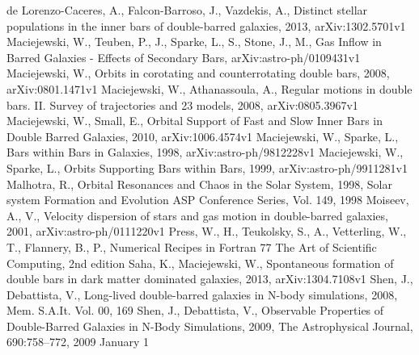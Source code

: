 \documentclass[a4paper,12pt]{article}
\begin{document}
\begin{thebibliography}{1}
de Lorenzo-Caceres, A., Falcon-Barroso, J., Vazdekis, A., Distinct stellar populations in the inner bars of double-barred galaxies, 2013, arXiv:1302.5701v1
Maciejewski, W., Teuben, P., J., Sparke, L., S., Stone, J., M., Gas Inflow in Barred Galaxies - Effects of Secondary Bars, arXiv:astro-ph/0109431v1
Maciejewski, W., Orbits in corotating and counterrotating double bars, 2008, arXiv:0801.1471v1
Maciejewski, W., Athanassoula, A., Regular motions in double bars. II. Survey of trajectories and 23 models, 2008, arXiv:0805.3967v1
Maciejewski, W., Small, E., Orbital Support of Fast and Slow Inner Bars in Double Barred Galaxies, 2010, arXiv:1006.4574v1
Maciejewski, W., Sparke, L., Bars within Bars in Galaxies, 1998, arXiv:astro-ph/9812228v1
Maciejewski, W., Sparke, L., Orbits Supporting Bars within Bars, 1999, arXiv:astro-ph/9911281v1
Malhotra, R., Orbital Resonances and Chaos in the Solar System, 1998, Solar system Formation and Evolution ASP Conference Series, Vol. 149, 1998
Moiseev, A., V., Velocity dispersion of stars and gas motion in double-barred galaxies, 2001, arXiv:astro-ph/0111220v1
Press, W., H., Teukolsky, S., A., Vetterling, W., T., Flannery, B., P., Numerical Recipes in Fortran 77 The Art of Scientific Computing, 2nd edition
Saha, K., Maciejewski, W., Spontaneous formation of double bars in dark matter dominated galaxies, 2013, arXiv:1304.7108v1
Shen, J., Debattista, V., Long-lived double-barred galaxies in N-body simulations, 2008, Mem. S.A.It. Vol. 00, 169
Shen, J., Debattista, V., Observable Properties of Double-Barred Galaxies in N-Body Simulations, 2009, The Astrophysical Journal, 690:758–772, 2009 January 1

\end{thebibliography}
\end{document}
